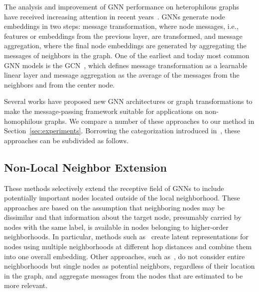 \documentclass[conference]{IEEEtran}
\begin{document}
The analysis and improvement of GNN performance on heterophilous graphs have received increasing attention in recent years~\cite{abu_mixhop_2019, zhu_beyond_2020, jin_universal_2021, wang_tree_2021,pei_geom-gcn_2019,suresh_breaking_2021,wei_node_2021,he_block_2022,yan_two_2021,bodnar_neural_2022,bo_beyond_2021,du_gbk_2022,yang_diverse_2021,chen_simple_2020,chien_adaptive_2021}.
GNNs generate node embeddings in two steps: message transformation, where node messages, i.e., features or embeddings from the previous layer, are transformed, and message aggregation, where the final node embeddings are generated by aggregating the messages of neighbors in the graph. One of the earliest and today most common GNN models is the GCN~\cite{kipf_semi_2017}, which defines message transformation as a learnable linear layer and message aggregation as the average of the messages from the neighbors and from the center node.

Several works have proposed new GNN architectures or graph transformations to make the message-passing framework suitable for applications on non-homophilous graphs. We compare a number of these approaches to our method in Section~\ref{sec:experiments}. Borrowing the categorization introduced in~\cite{zheng_graph_2022}, these approaches can be subdivided as follows.
\subsection{Non-Local Neighbor Extension}
These methods selectively extend the receptive field of GNNs to include potentially important nodes located outside of the local neighborhood. These approaches are based on the assumption that neighboring nodes may be dissimilar and that information about the target node, presumably carried by nodes with the same label, is available in nodes belonging to higher-order neighborhoods. In particular, methods such as~\cite{abu_mixhop_2019, zhu_beyond_2020, jin_universal_2021, wang_tree_2021} create latent representations for nodes using multiple neighborhoods at different hop distances and combine them into one overall embedding. Other approaches, such as~\cite{pei_geom-gcn_2019,suresh_breaking_2021,wei_node_2021,he_block_2022}, do not consider entire neighborhoods but single nodes as potential neighbors, regardless of their location in the graph, and aggregate messages from the nodes that are estimated to be more relevant. 
\end{document}

